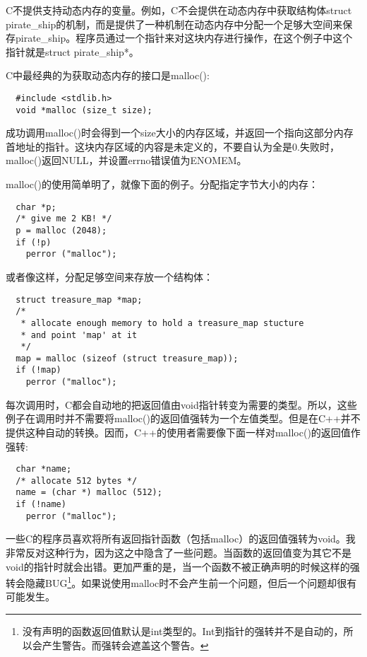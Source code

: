 C不提供支持动态内存的变量。例如，C不会提供在动态内存中获取结构体struct pirate\_ship的机制，而是提供了一种机制在动态内存中分配一个足够大空间来保存pirate\_ship。程序员通过一个指针来对这块内存进行操作，在这个例子中这个指针就是struct pirate\_ship*。

C中最经典的为获取动态内存的接口是malloc(): 

\begin{lstlisting}
  #include <stdlib.h>
  void *malloc (size_t size);
\end{lstlisting}

成功调用malloc()时会得到一个size大小的内存区域，并返回一个指向这部分内存首地址的指针。这块内存区域的内容是未定义的，不要自认为全是0.失败时，malloc()返回NULL，并设置errno错误值为ENOMEM。

malloc()的使用简单明了，就像下面的例子。分配指定字节大小的内存： 

\begin{lstlisting}
  char *p;
  /* give me 2 KB! */
  p = malloc (2048);
  if (!p)
    perror ("malloc");
\end{lstlisting}

或者像这样，分配足够空间来存放一个结构体： 

\begin{lstlisting}
  struct treasure_map *map;
  /*
   * allocate enough memory to hold a treasure_map stucture
   * and point 'map' at it
   */
  map = malloc (sizeof (struct treasure_map));
  if (!map)
    perror ("malloc");
\end{lstlisting}

每次调用时，C都会自动地的把返回值由void指针转变为需要的类型。所以，这些例子在调用时并不需要将malloc()的返回值强转为一个左值类型。但是在C++并不提供这种自动的转换。因而，C++的使用者需要像下面一样对malloc()的返回值作强转: 

\begin{lstlisting}
  char *name;
  /* allocate 512 bytes */
  name = (char *) malloc (512);
  if (!name)
    perror ("malloc");
\end{lstlisting}

一些C的程序员喜欢将所有返回指针函数（包括malloc）的返回值强转为void。我非常反对这种行为，因为这之中隐含了一些问题。当函数的返回值变为其它不是void的指针时就会出错。更加严重的是，当一个函数不被正确声明的时候这样的强转会隐藏BUG\footnote[1]{没有声明的函数返回值默认是int类型的。Int到指针的强转并不是自动的，所以会产生警告。而强转会遮盖这个警告。}。如果说使用malloc时不会产生前一个问题，但后一个问题却很有可能发生。

